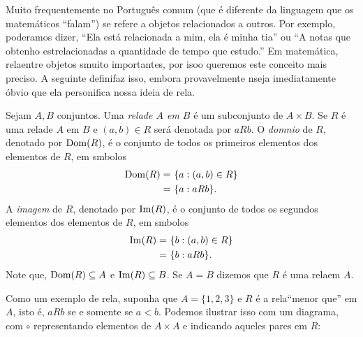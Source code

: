 Muito frequentemente no Portugu\^es comum (que \'e diferente da linguagem que os matem\'aticos ``falam'') se refere a objetos relacionados a outros. Por exemplo, poder\ih amos dizer, ``Ela est\'a relacionada a mim, ela \'e minha tia'' ou ``A notas que obtenho est\ao relacionadas a quantidade de tempo que estudo.'' Em matem\'atica, rela\coes entre objetos s\ao muito importantes, por isoo queremos este conceito mais preciso. A seguinte defini\cao faz isso, embora provavelmente n\ao seja imediatamente \'obvio  que ela personifica nossa ideia de rela\caoi. 
\begin{definb}
Sejam $A,B$ conjuntos. Uma {\it rela\cao de $A$ em $B$} \'e um subconjunto de $A\times B$. Se $R$ \'e uma rela\cao de $A$ em $B$ e $(a,b)\in R$ ser\'a denotada por $aRb$. O {\it dom\ih nio} de $R$, denotado por $\operatorname{Dom}(R)$, \'e o conjunto de todos os primeiros elementos dos elementos de $R$, em s\ih mbolos
\begin{equation*}
 \begin{aligned}
\operatorname{Dom}(R)=&\textrm{ } \{a: (a,b)\in R\}\\
      =&\textrm{ } \{a: aRb\}.
 \end{aligned}
\end{equation*}  
A {\it imagem} de $R$, denotado por $\operatorname{Im}(R)$, \'e o conjunto de todos os segundos elementos dos elementos de $R$, em s\ih mbolos
\begin{equation*}
 \begin{aligned}
\operatorname{Im}(R)=&\textrm{ } \{b: (a,b)\in R\}\\
     =&\textrm{ } \{b: aRb\}.
 \end{aligned}
\end{equation*}
Note que, $\operatorname{Dom}(R)\subseteq A$ e $\operatorname{Im}(R)\subseteq B$. Se $A=B$ dizemos que $R$ \'e uma rela\cao em $A$. 
\end{definb}

Como um exemplo de rela\caoi, suponha que $A=\{1,2,3\}$ e $R$ \'e a rela\cao ``menor que'' em $A$, isto \'e, $aRb$ se e somente se $a<b$. Podemos ilustrar isso com um diagrama, com $\circ$ representando elementos de $A\times A$ e \frame{$\circ$} indicando aqueles pares em $R$:

